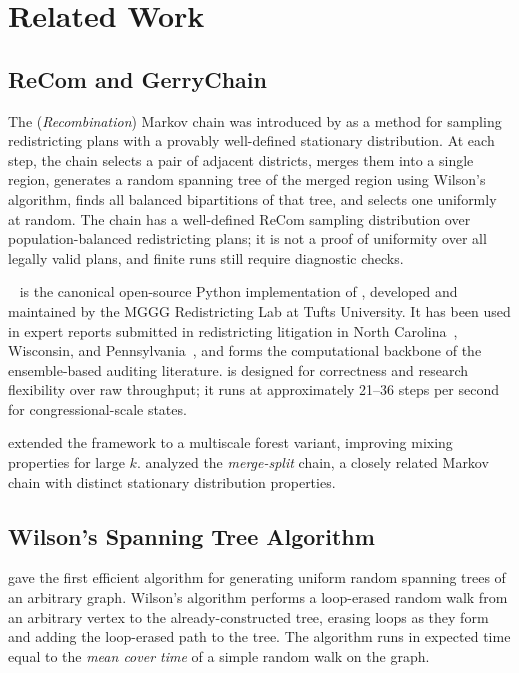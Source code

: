 \section{Related Work}
\label{sec:related}

\subsection{ReCom and GerryChain}

The \recom{} (\emph{Recombination}) Markov chain was introduced by
\citet{deford2021recombination} as a method for sampling redistricting
plans with a provably well-defined stationary distribution.
At each step, the chain selects a pair of adjacent districts, merges
them into a single region, generates a random spanning tree of the merged
region using Wilson's algorithm, finds all balanced bipartitions of that
tree, and selects one uniformly at random.
The chain has a well-defined ReCom sampling distribution over
population-balanced redistricting plans; it is not a proof of uniformity
over all legally valid plans, and finite runs still require diagnostic
checks.

\gc{}~\citep{gerrychain2021} is the canonical open-source Python
implementation of \recom{}, developed and maintained by the MGGG
Redistricting Lab at Tufts University.
It has been used in expert reports submitted in redistricting litigation
in North Carolina~\citep{herschlag2020quantifying}, Wisconsin, and
Pennsylvania~\citep{chikina2017assessing}, and forms the computational
backbone of the ensemble-based auditing literature.
\gc{} is designed for correctness and research flexibility over raw
throughput; it runs at approximately 21--36 steps per second for
congressional-scale states.

\citet{autry2021multiscale} extended the \recom{} framework to a
multiscale forest variant, improving mixing properties for large $k$.
\citet{carter2019merge} analyzed the \emph{merge-split} chain, a closely
related Markov chain with distinct stationary distribution properties.

\subsection{Wilson's Spanning Tree Algorithm}

\citet{wilson1996generating} gave the first efficient algorithm for
generating uniform random spanning trees of an arbitrary graph.
Wilson's algorithm performs a loop-erased random walk from an arbitrary
vertex to the already-constructed tree, erasing loops as they form and
adding the loop-erased path to the tree.
The algorithm runs in expected time equal to the \emph{mean cover time}
of a simple random walk on the graph.


